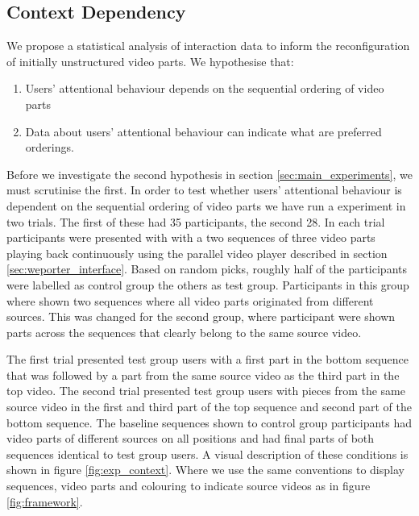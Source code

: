 \subsection{Context Dependency}
We propose a statistical analysis of interaction data to inform the reconfiguration of initially unstructured video parts. We hypothesise that:
\begin{enumerate}
  \item Users' attentional behaviour depends on the sequential ordering of video parts
  \item Data about users' attentional behaviour can indicate what are preferred orderings.
\end{enumerate}

Before we investigate the second hypothesis in section \ref{sec:main_experiments}, we must scrutinise the first. In order to test whether users' attentional behaviour is dependent on the sequential ordering of video parts we have run a experiment in two trials. The first of these had 35 participants, the second 28. In each trial participants were presented with with a two sequences of three video parts playing back continuously using the parallel video player described in section \ref{sec:weporter_interface}. Based on random picks, roughly half of the participants were labelled as control group the others as test group. Participants in this group where shown two sequences where all video parts originated from different sources. This was changed for the second group, where participant were shown parts across the sequences that clearly belong to the same source video. 

The first trial presented test group users with a first part in the bottom sequence that was followed by a part from the same source video as the third part in the top video. The second trial presented test group users with pieces from the same source video in the first and third part of the top sequence and second part of the bottom sequence. The baseline sequences shown to control group participants had video parts of different sources on all positions and had final parts of both sequences identical to test group users. A visual description of these conditions is shown in figure \ref{fig:exp_context}. Where we use the same conventions to display sequences, video parts and colouring to indicate source videos as in figure \ref{fig:framework}.

